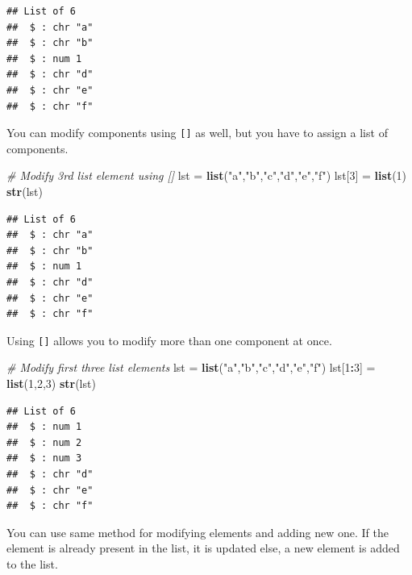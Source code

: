 \documentclass[
]{book}
\newenvironment{Shaded}{\begin{snugshade}}{\end{snugshade}}
\newcommand{\CommentTok}[1]{\textcolor[rgb]{0.56,0.35,0.01}{\textit{#1}}}
\newcommand{\DecValTok}[1]{\textcolor[rgb]{0.00,0.00,0.81}{#1}}
\newcommand{\KeywordTok}[1]{\textcolor[rgb]{0.13,0.29,0.53}{\textbf{#1}}}
\newcommand{\NormalTok}[1]{#1}
\newcommand{\OperatorTok}[1]{\textcolor[rgb]{0.81,0.36,0.00}{\textbf{#1}}}
\newcommand{\StringTok}[1]{\textcolor[rgb]{0.31,0.60,0.02}{#1}}
\begin{document}
\begin{verbatim}
## List of 6
##  $ : chr "a"
##  $ : chr "b"
##  $ : num 1
##  $ : chr "d"
##  $ : chr "e"
##  $ : chr "f"
\end{verbatim}

You can modify components using \texttt{{[}{]}} as well, but you have to assign a list of components.

\begin{Shaded}
\begin{Highlighting}[]
\CommentTok{# Modify 3rd list element using []}
\NormalTok{lst =}\StringTok{ }\KeywordTok{list}\NormalTok{(}\StringTok{"a"}\NormalTok{,}\StringTok{"b"}\NormalTok{,}\StringTok{"c"}\NormalTok{,}\StringTok{"d"}\NormalTok{,}\StringTok{"e"}\NormalTok{,}\StringTok{"f"}\NormalTok{)}
\NormalTok{lst[}\DecValTok{3}\NormalTok{] =}\StringTok{ }\KeywordTok{list}\NormalTok{(}\DecValTok{1}\NormalTok{)}
\KeywordTok{str}\NormalTok{(lst)}
\end{Highlighting}
\end{Shaded}

\begin{verbatim}
## List of 6
##  $ : chr "a"
##  $ : chr "b"
##  $ : num 1
##  $ : chr "d"
##  $ : chr "e"
##  $ : chr "f"
\end{verbatim}

Using \texttt{{[}{]}} allows you to modify more than one component at once.

\begin{Shaded}
\begin{Highlighting}[]
\CommentTok{# Modify first three list elements}
\NormalTok{lst =}\StringTok{ }\KeywordTok{list}\NormalTok{(}\StringTok{"a"}\NormalTok{,}\StringTok{"b"}\NormalTok{,}\StringTok{"c"}\NormalTok{,}\StringTok{"d"}\NormalTok{,}\StringTok{"e"}\NormalTok{,}\StringTok{"f"}\NormalTok{)}
\NormalTok{lst[}\DecValTok{1}\OperatorTok{:}\DecValTok{3}\NormalTok{] =}\StringTok{ }\KeywordTok{list}\NormalTok{(}\DecValTok{1}\NormalTok{,}\DecValTok{2}\NormalTok{,}\DecValTok{3}\NormalTok{)}
\KeywordTok{str}\NormalTok{(lst)}
\end{Highlighting}
\end{Shaded}

\begin{verbatim}
## List of 6
##  $ : num 1
##  $ : num 2
##  $ : num 3
##  $ : chr "d"
##  $ : chr "e"
##  $ : chr "f"
\end{verbatim}

You can use same method for modifying elements and adding new one. If the element is already present in the list, it is updated else, a new element is added to the list.
\end{document}
